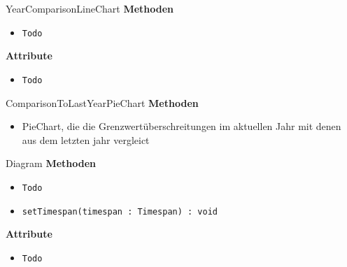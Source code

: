     \begin{Class}{YearComparisonLineChart}
        \textbf{Methoden}
        \begin{itemize}
            \item \texttt{Todo}
        \end{itemize}
        
        \textbf{Attribute}
        \begin{itemize}
            \item \texttt{Todo}
        \end{itemize}
    \end{Class}

    \begin{Class}{ComparisonToLastYearPieChart}
        \textbf{Methoden}
        \begin{itemize}
            \item PieChart, die die Grenzwertüberschreitungen im aktuellen Jahr mit denen aus dem letzten jahr vergleict 
        \end{itemize}
    \end{Class}

    \begin{Class}{Diagram}
        \textbf{Methoden}
        \begin{itemize}
            \item \texttt{Todo}
            \item \texttt{setTimespan(timespan : Timespan) : void}
        \end{itemize}
        
        \textbf{Attribute}
        \begin{itemize}
            \item \texttt{Todo}
        \end{itemize}
    \end{Class}

